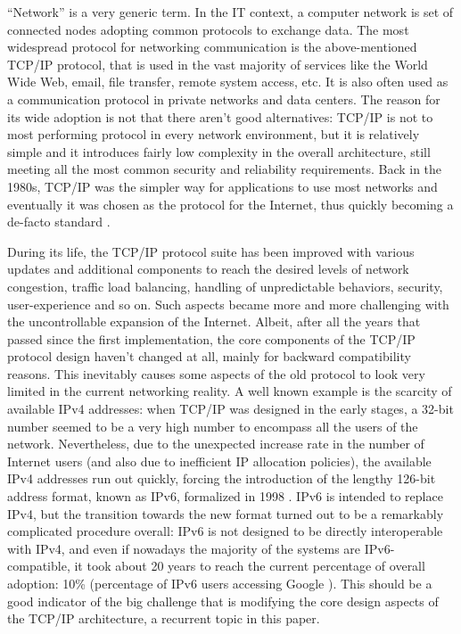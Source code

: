 ``Network'' is a very generic term. In the IT context, a computer network is set of connected nodes adopting common protocols to exchange data. The most widespread protocol for networking communication is the above-mentioned TCP/IP protocol, that is used in the vast majority of services like the World Wide Web, email, file transfer, remote system access, etc. It is also often used as a communication protocol in private networks and data centers.
The reason for its wide adoption is not that there aren't good alternatives: TCP/IP is not to most performing protocol in every network environment, but it is relatively simple and it introduces fairly low complexity in the overall architecture, still meeting all the most common security and reliability requirements. Back in the 1980s, TCP/IP was the simpler way for applications to use most networks and eventually it was chosen as the protocol for the Internet, thus quickly becoming a de-facto standard \cite{computerworld}.

During its life, the TCP/IP protocol suite has been improved with various updates and additional components to reach the desired levels of network congestion, traffic load balancing, handling of unpredictable behaviors, security, user-experience and so on. Such aspects became more and more challenging with the uncontrollable expansion of the Internet.
Albeit, after all the years that passed since the first implementation, the core components of the TCP/IP protocol design haven't changed at all, mainly for backward compatibility reasons. This inevitably causes some aspects of the old protocol to look very limited in the current networking reality. A well known example is the scarcity of available IPv4 addresses: when TCP/IP was designed in the early stages, a 32-bit number seemed to be a very high number to encompass all the users of the network. Nevertheless, due to the unexpected increase rate in the number of Internet users (and also due to inefficient IP allocation policies), the available IPv4 addresses run out quickly, forcing the introduction of the lengthy 126-bit address format, known as IPv6, formalized in 1998 \cite{rfc2460}. IPv6 is intended to replace IPv4, but the transition towards the new format turned out to be a remarkably complicated procedure overall: IPv6 is not designed to be directly interoperable with IPv4, and even if nowadays the majority of the systems are IPv6-compatible, it took about 20 years to reach the current percentage of overall adoption: 10\% (percentage of IPv6 users accessing Google \cite{google}). This should be a good indicator of the big challenge that is modifying the core design aspects of the TCP/IP architecture, a recurrent topic in this paper.

